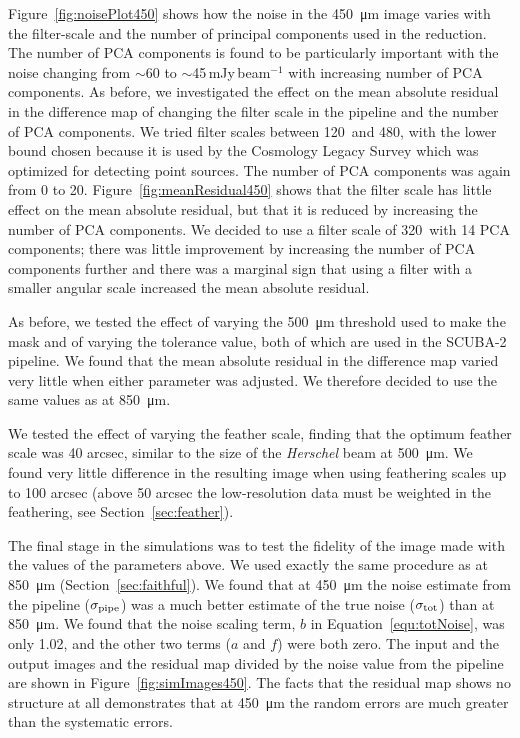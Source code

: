 \documentclass[a4paper,fleqn,usenatbib, twocolumn]{aastex63}
\begin{document}
Figure~\ref{fig:noisePlot450} shows how the noise in the \SI{450}{\micro\meter} image varies with the filter-scale
and the number of principal components used in the reduction. The number of PCA components is found to be 
particularly important with the noise changing from $\sim$60 to $\sim$45\,mJy\,beam$^{-1}$ with increasing 
number of PCA components.
As before, we investigated the effect on the mean absolute residual in the difference
map of changing the filter scale in the pipeline and the number of PCA
components. We tried filter scales between 120\arcsec\ and 480\arcsec,
with the lower bound chosen because it is used by the 
Cosmology Legacy Survey \citep{Geach2013} which was optimized for detecting point sources. The number of PCA components was again from 0 to 20. Figure~\ref{fig:meanResidual450} shows that the filter scale has little effect
on the mean absolute residual, but that it is reduced by increasing the
number of PCA components. We decided to use a filter scale of 320\arcsec\ with 14 PCA components; there was little improvement by increasing the number of PCA components
further and there was a marginal sign that using a filter with a smaller angular
scale increased the mean absolute residual.


As before, we tested the effect of varying the \SI{500}{\micro\meter} threshold 
used to make the mask and of varying the tolerance value, both of which are
used in the SCUBA-2 pipeline.
We found that the mean absolute residual in the difference map varied very
little when either parameter was adjusted. We therefore decided to use
the same values as at \SI{850}{\micro\meter}.

We tested the effect of varying the feather scale, finding that the optimum
feather scale was 40 arcsec, similar to the size of the {\it Herschel} beam
at \SI{500}{\micro\meter}. We found very little difference 
in the resulting image when using feathering scales up to 100 arcsec (above 50 arcsec
the low-resolution data must be weighted in the feathering, see Section~\ref{sec:feather}).

The final stage in the simulations was to test the fidelity of the image made with
the values of the parameters above. We used exactly the same procedure
as at \SI{850}{\micro\meter} (Section~\ref{sec:faithful}). We found that at \SI{450}{\micro\meter} the noise
estimate from the pipeline ($\sigma_{\rm pipe}$) was a much better estimate of the
true noise ($\sigma_{\rm tot}$) than at \SI{850}{\micro\meter}. We found that the noise scaling term, $b$ in  Equation~\ref{equ:totNoise}, was only 1.02, and the other two terms ($a$ and $f$) were both zero. The input and the output images and the residual map
divided by the noise value from the pipeline are shown in Figure~\ref{fig:simImages450}.
The facts that the residual map shows no structure at all demonstrates that at
\SI{450}{\micro\meter} the random errors are much greater than the systematic errors.
\end{document}
